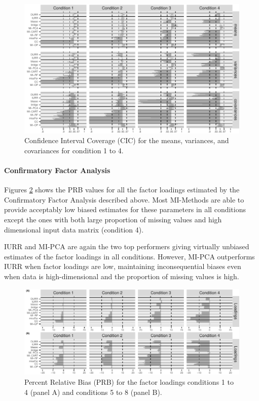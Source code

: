 \begin{figure}
	\includegraphics{../../output/graphs/exp2_semR_ci_14.pdf}
\caption{Confidence Interval Coverage (CIC) for the means, variances, and covariances for condition 1 to 4.}
\label{fig:exp2cir}
\end{figure}

\FloatBarrier %

\paragraph{Confirmatory Factor Analysis}

	Figures \ref{fig:exp2fl14} shows the PRB values for all the factor loadings estimated by
	the Confirmatory Factor Analysis described above. 
	Most MI-Methods are able to provide acceptably low biased estimates for these parameters in 
	all conditions except the ones with both large proportion of missing values and high 
	dimensional input data matrix (condition 4).

	IURR and MI-PCA are again the two top performers giving virtually unbiased estimates
	of the factor loadings in all conditions.
	However, MI-PCA outperforms IURR when factor loadings are low, maintaining inconsequential 
	biases even when data is high-dimensional and the proportion of missing values is high.

\begin{figure}[h]
	\includegraphics{../../output/graphs/exp2_CFA_lambda_BPR.pdf}
	\caption{Percent Relative Bias (PRB) for the factor loadings conditions 1 to 4 (panel A) 
		and conditions 5 to 8 (panel B).}
\label{fig:exp2fl14}
\end{figure}

\FloatBarrier %

